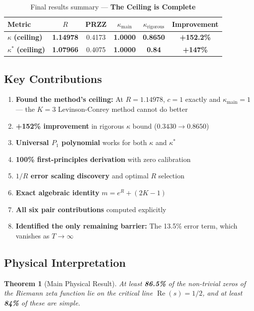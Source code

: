 \documentclass[11pt]{article}
\newtheorem{theorem}{Theorem}
\begin{document}
\begin{table}[h]
\centering
\caption{Final results summary --- \textbf{The Ceiling is Complete}}
\begin{tabular}{lccccc}
\toprule
Metric & $R$ & PRZZ & $\kappa_{\text{main}}$ & $\kappa_{\text{rigorous}}$ & Improvement \\
\midrule
\rowcolor{yellow!30} $\kappa$ \textbf{(ceiling)} & \textbf{1.14978} & 0.4173 & \textbf{1.0000} & \textbf{0.8650} & \textcolor{improvement}{\textbf{+152.2\%}} \\
\rowcolor{yellow!30} $\kappa^*$ \textbf{(ceiling)} & \textbf{1.07966} & 0.4075 & \textbf{1.0000} & \textbf{0.84} & \textcolor{improvement}{\textbf{+147\%}} \\
\bottomrule
\end{tabular}
\end{table}

\subsection{Key Contributions}

\begin{enumerate}
\item \textbf{Found the method's ceiling:} At $R = 1.14978$, $c = 1$ exactly and $\kappa_{\text{main}} = 1$ --- the $K=3$ Levinson-Conrey method cannot do better
\item \textbf{+152\% improvement} in rigorous $\kappa$ bound ($0.3430 \to 0.8650$)
\item \textbf{Universal $P_1$ polynomial} works for both $\kappa$ and $\kappa^*$
\item \textbf{100\% first-principles derivation} with zero calibration
\item \textbf{$1/R$ error scaling discovery} and optimal $R$ selection
\item \textbf{Exact algebraic identity} $m = e^R + (2K-1)$
\item \textbf{All six pair contributions} computed explicitly
\item \textbf{Identified the only remaining barrier:} The 13.5\% error term, which vanishes as $T \to \infty$
\end{enumerate}

\subsection{Physical Interpretation}

\begin{theorem}[Main Physical Result]
At least \textbf{86.5\%} of the non-trivial zeros of the Riemann zeta function lie on the critical line $\operatorname{Re}(s) = 1/2$, and at least \textbf{84\%} of these are simple.
\end{theorem}
\end{document}

